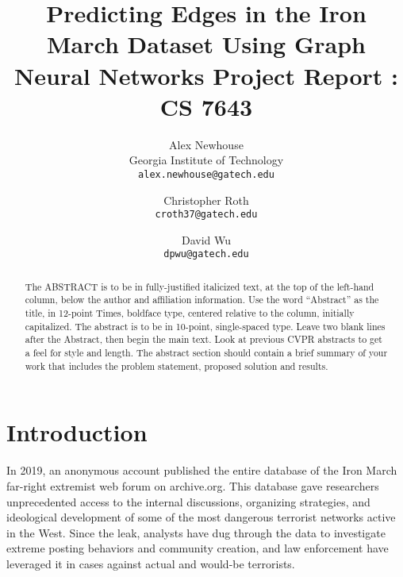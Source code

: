 \documentclass[10pt,twocolumn,letterpaper]{article}
\begin{document}
\title{Predicting Edges in the Iron March Dataset Using Graph Neural Networks
 \large Project Report : CS 7643 }

\author{Alex Newhouse\\
Georgia Institute of Technology\\
{\tt\small alex.newhouse@gatech.edu}
\and
Christopher Roth\\
{\tt\small croth37@gatech.edu}
\and
David Wu\\
{\tt\small dpwu@gatech.edu}
}

\maketitle

\begin{abstract}
   The ABSTRACT is to be in fully-justified italicized text, at the top
   of the left-hand column, below the author and affiliation
   information. Use the word ``Abstract'' as the title, in 12-point
   Times, boldface type, centered relative to the column, initially
   capitalized. The abstract is to be in 10-point, single-spaced type.
   Leave two blank lines after the Abstract, then begin the main text.
   Look at previous CVPR abstracts to get a feel for style and length. 
   The abstract section should contain a brief summary of your work that
   includes the problem statement, proposed solution and results.
\end{abstract}

\section{Introduction}

In 2019, an anonymous account published the entire database of the Iron March far-right extremist web forum on archive.org. This database gave researchers unprecedented access to the internal discussions, organizing strategies, and ideological  development of some of the most dangerous terrorist networks active in the West. Since the leak, analysts have dug through the data to investigate extreme posting behaviors and community creation, and law enforcement have leveraged it in cases against actual and would-be terrorists. 
\end{document}
